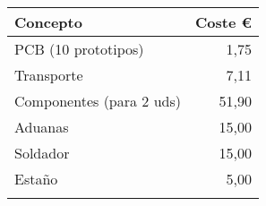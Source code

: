 \begin{longtable}[]{@{}lr@{}}
\toprule
\begin{minipage}[b]{0.38\columnwidth}\raggedright\strut
\textbf{Concepto}\strut
\end{minipage} & \begin{minipage}[b]{0.20\columnwidth}\raggedleft\strut
\textbf{Coste \euro{}}\strut
\end{minipage}\tabularnewline
\midrule
\endhead
\begin{minipage}[t]{0.38\columnwidth}\raggedright\strut
PCB (10 prototipos)\strut
\end{minipage} & \begin{minipage}[t]{0.20\columnwidth}\raggedleft\strut
1,75\strut
\end{minipage}\tabularnewline
\begin{minipage}[t]{0.38\columnwidth}\raggedright\strut
Transporte\strut
\end{minipage} & \begin{minipage}[t]{0.20\columnwidth}\raggedleft\strut
7,11\strut
\end{minipage}\tabularnewline
\begin{minipage}[t]{0.38\columnwidth}\raggedright\strut
Componentes (para 2 uds)\strut
\end{minipage} & \begin{minipage}[t]{0.20\columnwidth}\raggedleft\strut
51,90\strut
\end{minipage}\tabularnewline
\begin{minipage}[t]{0.38\columnwidth}\raggedright\strut
Aduanas\strut
\end{minipage} & \begin{minipage}[t]{0.20\columnwidth}\raggedleft\strut
15,00\strut
\end{minipage}\tabularnewline
\begin{minipage}[t]{0.38\columnwidth}\raggedright\strut
Soldador\strut
\end{minipage} & \begin{minipage}[t]{0.20\columnwidth}\raggedleft\strut
15,00\strut
\end{minipage}\tabularnewline
\begin{minipage}[t]{0.38\columnwidth}\raggedright\strut
Estaño\strut
\end{minipage} & \begin{minipage}[t]{0.20\columnwidth}\raggedleft\strut
5,00\strut
\end{minipage}\tabularnewline
\begin{minipage}[t]{0.38\columnwidth}\raggedright\strut

\end{minipage}
\end{longtable}
